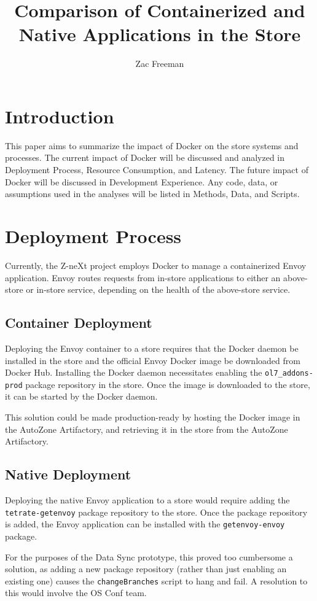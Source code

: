 \documentclass{article}
\title{Comparison of Containerized and Native Applications in the Store}
\author{Zac Freeman}
\begin{document}
\maketitle

\section{Introduction}
This paper aims to summarize the impact of Docker on the store systems and processes. The current impact of Docker will be discussed and analyzed in Deployment Process, Resource Consumption, and Latency. The future impact of Docker will be discussed in Development Experience. Any code, data, or assumptions used in the analyses will be listed in Methods, Data, and Scripts.

\section{Deployment Process}
Currently, the Z-neXt project employs Docker to manage a containerized Envoy application. Envoy routes requests from in-store applications to either an above-store or in-store service, depending on the health of the above-store service.

\subsection{Container Deployment}
Deploying the Envoy container to a store requires that the Docker daemon be installed in the store and the official Envoy Docker image be downloaded from Docker Hub. Installing the Docker daemon necessitates enabling the \texttt{ol7\_addons-prod} package repository in the store. Once the image is downloaded to the store, it can be started by the Docker daemon.

This solution could be made production-ready by hosting the Docker image in the AutoZone Artifactory, and retrieving it in the store from the AutoZone Artifactory.

\subsection{Native Deployment}
Deploying the native Envoy application to a store would require adding the \texttt{tetrate-getenvoy} package repository to the store. Once the package repository is added, the Envoy application can be installed with the \texttt{getenvoy-envoy} package.

For the purposes of the Data Sync prototype, this proved too cumbersome a solution, as adding a new package repository (rather than just enabling an existing one) causes the \texttt{changeBranches} script to hang and fail. A resolution to this would involve the OS Conf team.
\end{document}
